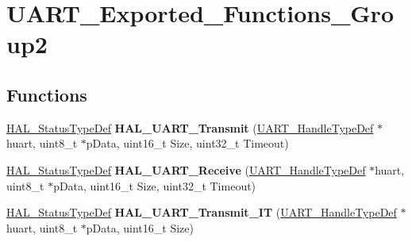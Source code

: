 \hypertarget{group___u_a_r_t___exported___functions___group2}{}\section{U\+A\+R\+T\+\_\+\+Exported\+\_\+\+Functions\+\_\+\+Group2}
\label{group___u_a_r_t___exported___functions___group2}
\subsection*{Functions}
\begin{DoxyCompactItemize}
\item 
\mbox{\label{group___u_a_r_t___exported___functions___group2_ga210329848c1873957034e129ccf8944e}} 
\hyperlink{stm32f1xx__hal__def_8h_a63c0679d1cb8b8c684fbb0632743478f}{H\+A\+L\+\_\+\+Status\+Type\+Def} {\bfseries H\+A\+L\+\_\+\+U\+A\+R\+T\+\_\+\+Transmit} (\hyperlink{struct_u_a_r_t___handle_type_def}{U\+A\+R\+T\+\_\+\+Handle\+Type\+Def} $\ast$huart, uint8\+\_\+t $\ast$p\+Data, uint16\+\_\+t Size, uint32\+\_\+t Timeout)
\item 
\mbox{\label{group___u_a_r_t___exported___functions___group2_gab868edc590e3b827a14528a25c999e2f}} 
\hyperlink{stm32f1xx__hal__def_8h_a63c0679d1cb8b8c684fbb0632743478f}{H\+A\+L\+\_\+\+Status\+Type\+Def} {\bfseries H\+A\+L\+\_\+\+U\+A\+R\+T\+\_\+\+Receive} (\hyperlink{struct_u_a_r_t___handle_type_def}{U\+A\+R\+T\+\_\+\+Handle\+Type\+Def} $\ast$huart, uint8\+\_\+t $\ast$p\+Data, uint16\+\_\+t Size, uint32\+\_\+t Timeout)
\item 
\mbox{\label{group___u_a_r_t___exported___functions___group2_gaf223f2bcc2f5734f147cc5c626d757b0}} 
\hyperlink{stm32f1xx__hal__def_8h_a63c0679d1cb8b8c684fbb0632743478f}{H\+A\+L\+\_\+\+Status\+Type\+Def} {\bfseries H\+A\+L\+\_\+\+U\+A\+R\+T\+\_\+\+Transmit\+\_\+\+IT} (\hyperlink{struct_u_a_r_t___handle_type_def}{U\+A\+R\+T\+\_\+\+Handle\+Type\+Def} $\ast$huart, uint8\+\_\+t $\ast$p\+Data, uint16\+\_\+t Size)
\item 
\mbox{\label{group___u_a_r_t___exported___functions___group2_gadc0c3ef2109881d011601f0d41e70e40}} 

\end{DoxyCompactItemize}
